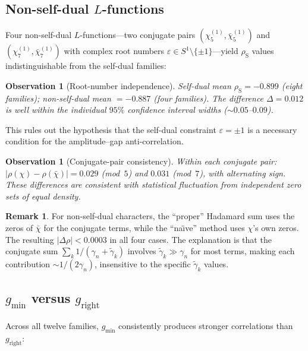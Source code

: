 \documentclass[11pt, a4paper]{article}
\theoremstyle{plain}
\newtheorem{observation}[theorem]{Observation}
\theoremstyle{definition}
\newtheorem{remark}{Remark}[section]
\begin{document}
\subsection{Non-self-dual $L$-functions}
\label{ssec:non_self_dual}

Four non-self-dual $L$-functions---two conjugate pairs
$(\chi_5^{(1)}, \bar{\chi}_5^{(1)})$ and
$(\chi_7^{(1)}, \bar{\chi}_7^{(1)})$ with complex root numbers
$\varepsilon \in S^1 \setminus \{\pm 1\}$---yield
$\rho_{\mathrm{S}}$ values indistinguishable from the self-dual
families:

\begin{observation}[Root-number independence]
\label{obs:root_number}
Self-dual mean $\rho_{\mathrm{S}} = -0.899$ (eight families);
non-self-dual mean $= -0.887$ (four families).
The difference $\Delta = 0.012$ is well within the individual
$95\%$ confidence interval widths (${\sim}0.05$--$0.09$).
\end{observation}

This rules out the hypothesis that the self-dual constraint
$\varepsilon = \pm 1$ is a necessary condition for the
amplitude--gap anti-correlation.

\begin{observation}[Conjugate-pair consistency]
\label{obs:conjugate}
Within each conjugate pair:
$|\rho(\chi) - \rho(\bar{\chi})| = 0.029$ (mod~$5$) and
$0.031$ (mod~$7$), with alternating sign.
These differences are consistent with statistical fluctuation
from independent zero sets of equal density.
\end{observation}

\begin{remark}\label{rem:proper_naive}
For non-self-dual characters, the ``proper'' Hadamard sum uses
the zeros of $\bar{\chi}$ for the conjugate terms, while the
``na\"{\i}ve'' method uses $\chi$'s own zeros.
The resulting $|\Delta\rho| < 0.0003$ in all four cases.
The explanation is that the conjugate sum
$\sum_k 1/(\gamma_n + \tilde{\gamma}_k)$ involves
$\tilde{\gamma}_k \gg \gamma_n$ for most terms, making each
contribution $\sim 1/(2\gamma_n)$, insensitive to the specific
$\tilde{\gamma}_k$ values.
\end{remark}


\subsection{$g_{\min}$ versus $g_{\mathrm{right}}$}
\label{ssec:gap_comparison}

Across all twelve families, $g_{\min}$ consistently produces
stronger correlations than $g_{\mathrm{right}}$:
\end{document}
